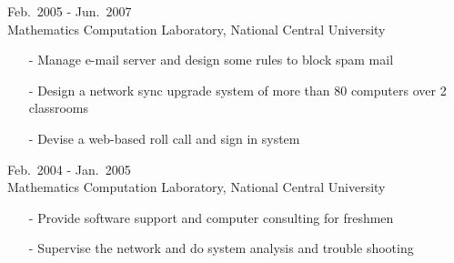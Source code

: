 \documentclass[a4paper,10pt,dvipdfmx]{article}
\begin{document}
 \hfill Feb.~2005 - Jun.~2007\\
\indent Mathematics Computation Laboratory, National Central University
\begin{itemize}[noitemsep,nolistsep]
  \item[-] Manage e-mail server and design some rules to block spam mail
  \item[-] Design a network sync upgrade system of more than 80 computers over 2 classrooms
  \item[-] Devise a web-based roll call and sign in system\\
\end{itemize}

 \hfill Feb.~2004 - Jan.~2005\\
\indent Mathematics Computation Laboratory, National Central University
\begin{itemize}[noitemsep,nolistsep]
  \item[-] Provide software support and computer consulting for freshmen
  \item[-] Supervise the network and do system analysis and trouble shooting
\end{itemize}

\end{document}
